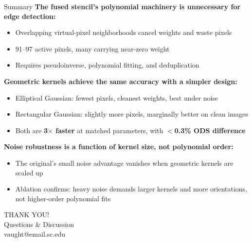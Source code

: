\documentclass[10pt, aspectratio=169]{beamer}
\begin{document}
\begin{frame}{Summary}
  \textbf{The fused stencil's polynomial machinery is unnecessary for edge detection:}
  \begin{itemize}
    \item Overlapping virtual-pixel neighborhoods cancel weights and waste pixels
    \item 91--97 active pixels, many carrying near-zero weight
    \item Requires pseudoinverse, polynomial fitting, and deduplication
  \end{itemize}

  \vspace{0.5em}
  \textbf{Geometric kernels achieve the same accuracy with a simpler design:}
  \begin{itemize}
    \item Elliptical Gaussian: fewest pixels, cleanest weights, best under noise
    \item Rectangular Gaussian: slightly more pixels, marginally better on clean images
    \item Both are \textbf{3$\times$ faster} at matched parameters, with \textbf{$<$0.3\% ODS difference}
  \end{itemize}

  \vspace{0.5em}
  \textbf{Noise robustness is a function of kernel size, not polynomial order:}
  \begin{itemize}
    \item The original's small noise advantage vanishes when geometric kernels are scaled up
    \item Ablation confirms: heavy noise demands larger kernels and more orientations, not higher-order polynomial fits
  \end{itemize}
\end{frame}

{
  \begin{frame}[plain]
    \vfill
    \centering
    {\fontsize{50}{55}\selectfont\impactfont\color{UofSCWhite} THANK YOU!}\\[1em]
    {\Large\color{UofSCWhite} Questions \& Discussion}\\[0.5em]
    {\normalsize\color{UofSCGray30} vaught@email.sc.edu}
    \vfill
  \end{frame}
}
\end{document}

